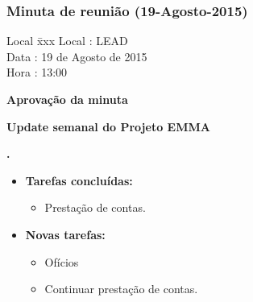 \subsubsection{Minuta de reunião (19-Agosto-2015)}

\begin{tabbing}
  Local \= xxx \kill
  Local \> : LEAD \\
  Data  \> : 19 de Agosto de 2015 \\
  Hora  \> : 13:00
\end{tabbing}


\textbf{Aprovação da minuta}

\textbf{Update semanal do Projeto EMMA}
   							
\textbf{\alana.} 
	\begin{itemize}
		\item \textbf{Tarefas concluídas:}
			\begin{itemize}    
				\item Prestação de contas.
			\end{itemize}
		
		\item \textbf{Novas tarefas:}
			\begin{itemize} 
				\item Ofícios
				\item Continuar prestação de contas.
			\end{itemize}
	\end{itemize}   		
						
